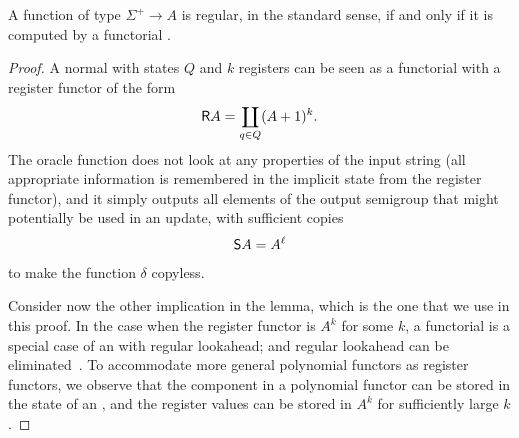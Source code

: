 \begin{lemma}\label{lem:functorial-sst-complete}
    A function of type $\Sigma^+ \to A$ is regular, in the standard sense, if and only if it is computed by a functorial \sst. 
\end{lemma}
\begin{proof}
    A normal \sst with states $Q$ and $k$ registers can be seen as a functorial \sst with a register functor of the form 
    \begin{align*}
    \mathsf R A = \coprod_{q \in Q} (A + 1)^k.
    \end{align*}
    The oracle function does not look at any properties of the input string (all appropriate information is remembered in the implicit state from the register functor), and it simply outputs all elements of the output semigroup that might potentially be used in an update, with sufficient copies 
    \begin{align*}
    \mathsf S A = A^\ell
    \end{align*}
    to make the function $\delta$ copyless. 

    Consider now the other implication in the lemma, which is the one that we use in this proof. In the case when the register functor is $A^k$ for some $k$,  a functorial \sst is a special case of an \sst with regular lookahead; and regular lookahead can be eliminated~\cite[Lemma 13.6]{bojanczyk_automata_2018}. To accommodate more general polynomial functors as register functors, we observe that the component in a polynomial functor can be stored in the state of an \sst, and the register values can be stored in $A^k$ for sufficiently large $k$. 
\end{proof}
